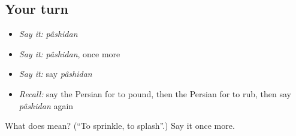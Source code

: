 \subsection*{Your turn}
\begin{itemize}
\raggedright
  \item \emph{Say it:} \emph{pâshidan}
  \item \emph{Say it:} \emph{pâshidan}, once more
  \item \emph{Say it:} say \emph{pâshidan}
  \item \emph{Recall:} say the Persian for to pound, then the Persian for to rub, then say \emph{pâshidan} again
\end{itemize}

\begin{tcolorbox}[breakable,colback=teal!4,colframe=teal!35!black,title={Before you move on}]
What does  mean? (\textquotedblleft{}To sprinkle, to splash\textquotedblright{}.) Say it once more.
\end{tcolorbox}
